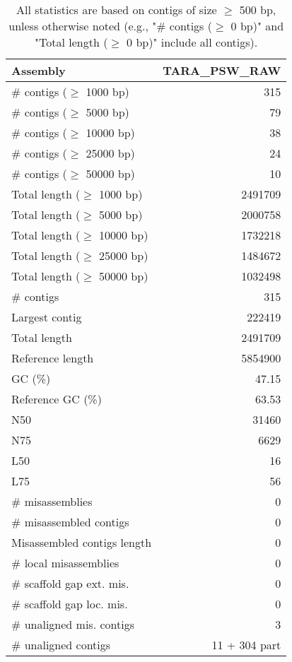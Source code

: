 \documentclass[12pt,a4paper]{article}
\begin{document}
\begin{table}[ht]
\begin{center}
\caption{All statistics are based on contigs of size $\geq$ 500 bp, unless otherwise noted (e.g., "\# contigs ($\geq$ 0 bp)" and "Total length ($\geq$ 0 bp)" include all contigs).}
\begin{tabular}{|l*{1}{|r}|}
\hline
Assembly & TARA\_PSW\_RAW \\ \hline
\# contigs ($\geq$ 1000 bp) & 315 \\ \hline
\# contigs ($\geq$ 5000 bp) & 79 \\ \hline
\# contigs ($\geq$ 10000 bp) & 38 \\ \hline
\# contigs ($\geq$ 25000 bp) & 24 \\ \hline
\# contigs ($\geq$ 50000 bp) & 10 \\ \hline
Total length ($\geq$ 1000 bp) & 2491709 \\ \hline
Total length ($\geq$ 5000 bp) & 2000758 \\ \hline
Total length ($\geq$ 10000 bp) & 1732218 \\ \hline
Total length ($\geq$ 25000 bp) & 1484672 \\ \hline
Total length ($\geq$ 50000 bp) & 1032498 \\ \hline
\# contigs & 315 \\ \hline
Largest contig & 222419 \\ \hline
Total length & 2491709 \\ \hline
Reference length & 5854900 \\ \hline
GC (\%) & 47.15 \\ \hline
Reference GC (\%) & 63.53 \\ \hline
N50 & 31460 \\ \hline
N75 & 6629 \\ \hline
L50 & 16 \\ \hline
L75 & 56 \\ \hline
\# misassemblies & 0 \\ \hline
\# misassembled contigs & 0 \\ \hline
Misassembled contigs length & 0 \\ \hline
\# local misassemblies & 0 \\ \hline
\# scaffold gap ext. mis. & 0 \\ \hline
\# scaffold gap loc. mis. & 0 \\ \hline
\# unaligned mis. contigs & 3 \\ \hline
\# unaligned contigs & 11 + 304 part \\ \hline

\end{tabular}
\end{center}
\end{table}
\end{document}
